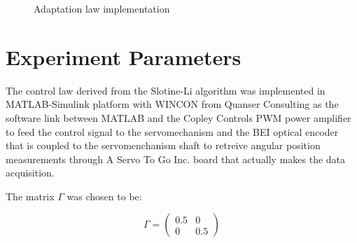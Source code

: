 \documentclass[journal]{IEEEtran}
\begin{document}
    \begin{figure}[!t]
        \centering
        \caption{Adaptation law implementation}
        \label{fig_adaptation}
    \end{figure}

\section{Experiment Parameters}
    
    The control law derived from the Slotine-Li algorithm was implemented in MATLAB-Simulink platform with WINCON from Quanser Consulting as the software link between MATLAB and the Copley Controls PWM power amplifier to feed the control signal to the servomechanism and the BEI optical encoder that is coupled to the servomenchanism shaft to retreive angular position measurements through A Servo To Go Inc. board that actually makes the data acquisition.

    The matrix $\Gamma$ was chosen to be:

    \begin{equation*}
        \Gamma =
        \begin{pmatrix}
            0.5 & 0 \\
            0 & 0.5 
        \end{pmatrix}
    \end{equation*}
\end{document}
